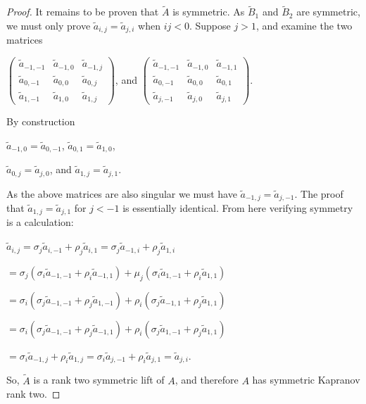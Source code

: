 \documentclass{article}
\begin{document}
\begin{proof}
  It remains to be proven that $\tilde{A}$ is symmetric. As $\tilde{B}_{1}$ and $\tilde{B}_{2}$ are symmetric, we must only prove $\tilde{a}_{i,j} = \tilde{a}_{j,i}$ when $ij < 0$. Suppose $j > 1$, and examine the two matrices 
  \begin{center}
    $\left(\begin{array}{ccc} \tilde{a}_{-1,-1} & \tilde{a}_{-1,0} & \tilde{a}_{-1,j} \\ \tilde{a}_{0,-1} & \tilde{a}_{0,0} & \tilde{a}_{0,j} \\ \tilde{a}_{1,-1} & \tilde{a}_{1,0} & \tilde{a}_{1,j} \end{array}\right)$, \hspace{.1 in} and \hspace{.1 in} $\left(\begin{array}{ccc} \tilde{a}_{-1,-1} & \tilde{a}_{-1,0} & \tilde{a}_{-1,1} \\ \tilde{a}_{0,-1} & \tilde{a}_{0,0} & \tilde{a}_{0,1} \\ \tilde{a}_{j,-1} & \tilde{a}_{j,0} & \tilde{a}_{j,1} \end{array}\right)$.
  \end{center}
  By construction 
  \begin{center}
    $\tilde{a}_{-1,0} = \tilde{a}_{0,-1}$, \hspace{.1 in} $\tilde{a}_{0,1} = \tilde{a}_{1,0}$, 
    
    $\tilde{a}_{0,j} = \tilde{a}_{j,0}$, \hspace{.1 in} and \hspace{.1 in} $\tilde{a}_{1,j} = \tilde{a}_{j,1}$.
  \end{center}
  As the above matrices are also singular we must have $\tilde{a}_{-1,j} = \tilde{a}_{j,-1}$. The proof that $\tilde{a}_{1,j} = \tilde{a}_{j,1}$ for $j < -1$ is essentially identical. From here verifying symmetry is a calculation:
  \begin{center}
    
    $\tilde{a}_{i,j} = \sigma_{j} \tilde{a}_{i,-1} + \rho_{j} \tilde{a}_{i,1} = \sigma_{j} \tilde{a}_{-1,i} + \rho_{j} \tilde{a}_{1,i}$
    
    $= \sigma_{j} (\sigma_{i} \tilde{a}_{-1,-1} + \rho_{i} \tilde{a}_{-1,1}) + \mu_{j} (\sigma_{i} \tilde{a}_{1,-1} + \rho_{i} \tilde{a}_{1,1})$
    
    $= \sigma_{i} (\sigma_{j} \tilde{a}_{-1,-1} + \rho_{j} \tilde{a}_{1,-1}) + \rho_{i} (\sigma_{j} \tilde{a}_{-1,1} + \rho_{j} \tilde{a}_{1,1})$
    
    $= \sigma_{i} (\sigma_{j} \tilde{a}_{-1,-1} + \rho_{j} \tilde{a}_{-1,1}) + \rho_{i} (\sigma_{j} \tilde{a}_{1,-1} + \rho_{j} \tilde{a}_{1,1})$
    
    $= \sigma_{i} \tilde{a}_{-1,j} + \rho_{i} \tilde{a}_{1,j} = \sigma_{i} \tilde{a}_{j,-1} + \rho_{i} \tilde{a}_{j,1} = \tilde{a}_{j,i}$.
  \end{center}
  
  So, $\tilde{A}$ is a rank two symmetric lift of $A$, and therefore $A$ has symmetric Kapranov rank two.
\end{proof}
\end{document}
